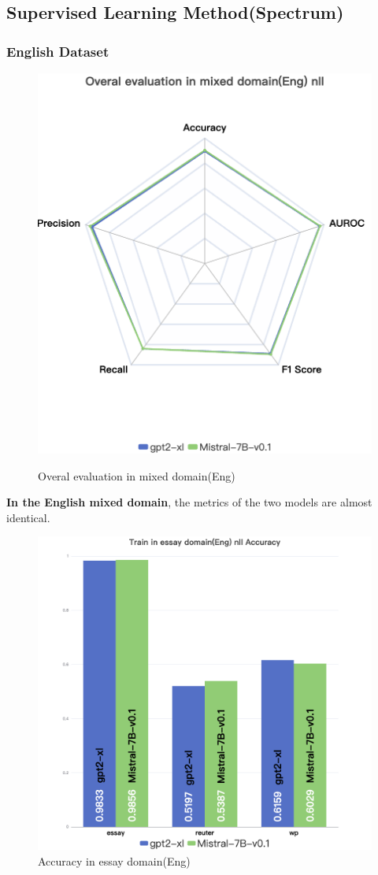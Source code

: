 \documentclass[lettersize,journal]{IEEEtran}
\begin{document}
\subsection{Supervised Learning Method(Spectrum)}
\subsubsection{English Dataset}

    \begin{figure}[h!]
        \centering
        \includegraphics[width=0.5\linewidth]{images/Overal evaluation in mixed domain(Eng) nll.png}
        \label{fig:enter-label}
        \caption{Overal evaluation in mixed domain(Eng)}
    \end{figure}
   

\textbf{In the English mixed domain}, the metrics of the two models are almost identical.


 \begin{figure}[H]
        \centering
    \includegraphics[width=0.8\linewidth]{images/Train in essay domain(Eng) nll Accuracy.png}
    \caption{Accuracy in essay domain(Eng)}
     \end{figure}
   
\end{document}
